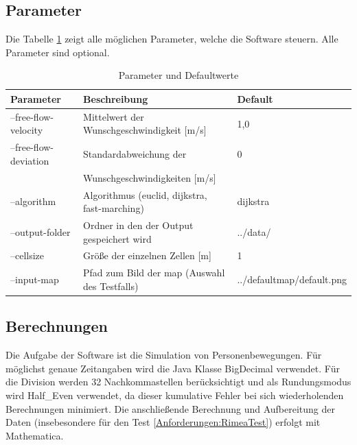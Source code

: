 \subsection{Parameter}
Die Tabelle \ref{tab:parameter} zeigt alle möglichen Parameter, welche die Software steuern. Alle Parameter sind optional.
\begin{table}[htpb]
	\centering
	\begin{tabular}{lll}
		Parameter & Beschreibung  &  Default\\ \hline
		--free-flow-velocity & Mittelwert der Wunschgeschwindigkeit [m/s] & 1,0 \\
		--free-flow-deviation & Standardabweichung der & 0\\
							  & Wunschgeschwindigkeiten [m/s] &  \\
		--algorithm & Algorithmus (euclid, dijkstra, fast-marching) & dijkstra \\
		--output-folder & Ordner in den der Output gespeichert wird & ../data/ \\
		--cellsize & Größe der einzelnen Zellen [m] & 1 \\
		--input-map & Pfad zum Bild der map (Auswahl des Testfalls) & ../defaultmap/default.png \\
		
	\end{tabular}
	\caption{Parameter und Defaultwerte}
	\label{tab:parameter}
\end{table}
	
\subsection{Berechnungen}
Die Aufgabe der Software ist die Simulation von Personenbewegungen. Für möglichst genaue Zeitangaben wird die Java Klasse BigDecimal verwendet. Für die Division werden 32 Nachkommastellen berücksichtigt und als Rundungsmodus wird Half\_Even verwendet, da dieser kumulative Fehler bei sich wiederholenden Berechnungen minimiert. Die anschließende Berechnung und Aufbereitung der Daten (insebesondere für den Test \ref{Anforderungen:RimeaTest}) erfolgt mit Mathematica.

